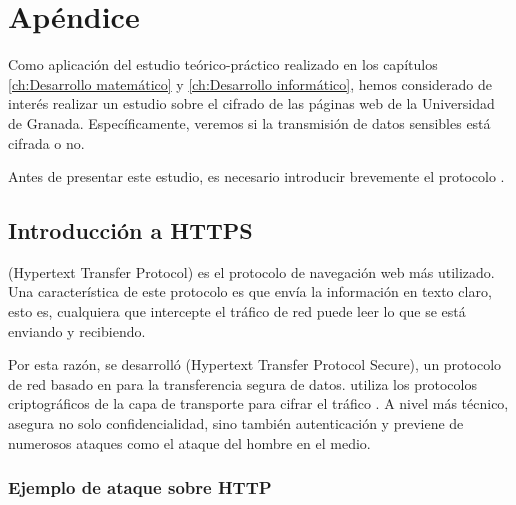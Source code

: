 \chapter{Apéndice}
\label{ap:apendice}


\begin{center}
\end{center}

Como aplicación del estudio teórico-práctico realizado en los capítulos \ref{ch:Desarrollo matemático} y \ref{ch:Desarrollo informático}, hemos considerado de interés realizar un estudio sobre el cifrado de las páginas web de la Universidad de Granada. Específicamente, veremos si la transmisión de datos sensibles está cifrada o no.

Antes de presentar este estudio, es necesario introducir brevemente el protocolo .

\section{Introducción a HTTPS}

 (Hypertext Transfer Protocol) es el protocolo de navegación web más utilizado. Una característica de este protocolo es que envía la información en texto claro, esto es, cualquiera que intercepte el tráfico de red puede leer lo que se está enviando y recibiendo.

Por esta razón, se desarrolló  (Hypertext Transfer Protocol Secure), un protocolo de red basado en  para la transferencia segura de datos.  utiliza los protocolos criptográficos  de la capa de transporte para cifrar el tráfico . A nivel más técnico,  asegura no solo confidencialidad, sino también autenticación y previene de numerosos ataques como el ataque del hombre en el medio.

\subsection{Ejemplo de ataque sobre HTTP}
\label{sub:Ejemplo de ataque sobre HTTP}

